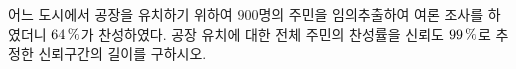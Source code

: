 어느 도시에서 공장을 유치하기 위하여 $900$명의 주민을 임의추출하여 여론 조사를 하였더니 $64\mkern3mu \%$가 찬성하였다. 공장 유치에 대한 전체 주민의 찬성률을 신뢰도 $99\mkern3mu \%$로 추정한 신뢰구간의 길이를 구하시오. 
